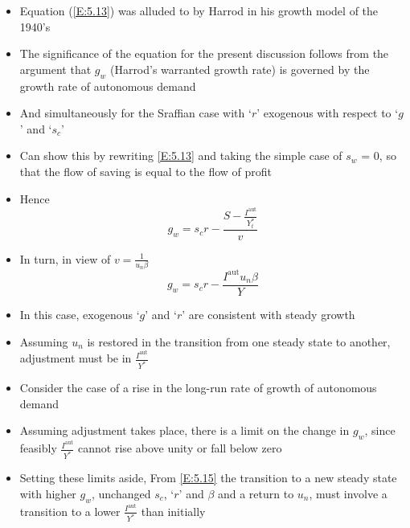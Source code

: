 \documentclass{article}
\begin{document}
\begin{itemize}
		\item Equation (\ref{E:5.13}) was alluded to by Harrod in his growth model of the 1940's
		\item The significance of the equation for the present discussion follows from the argument that \( g_w \) (Harrod's warranted growth rate) is governed by the growth rate of autonomous demand
		\item And simultaneously for the Sraffian case with `\( r \)' exogenous with respect to `\( g \)' and `\( s_c \)'
		\item Can show this by rewriting \cref{E:5.13} and taking the simple case of \( s_w \) = 0, so that the flow of saving is equal to the flow of profit
		\item Hence
		\begin{equation}
			g_w = s_cr - \frac{S-\frac{I^\text{aut}}{Y_t^*}}{v} \label{E:5.14}
		\end{equation}
		\item In turn, in view of \( v = \frac{1}{u_n \beta} \)
		\begin{equation}
			g_w = s_cr-\frac{I^\text{aut}u_n\beta}{Y} \label{E:5.15}
		\end{equation}
		\item In this case, exogenous `\( g \)' and `\( r \)' are consistent with steady growth
		\item Assuming \( u_n \) is restored in the transition from one steady state to another, adjustment must be in \( \frac{I^\text{aut}}{Y^*} \)
		\item Consider the case of a rise in the long-run rate of growth of autonomous demand
		\item Assuming adjustment takes place, there is a limit on the change in \( g_w \), since feasibly \( \frac{I^\text{aut}}{Y^*} \) cannot rise above unity or fall below zero
		\item Setting these limits aside, From \cref{E:5.15} the transition to a new steady state with higher \( g_w \), unchanged \( s_c \), `\( r \)' and \( \beta \) and a return to \( u_n \), must involve a transition to a lower \( \frac{I^\text{aut}}{Y^*} \) than initially
	\end{itemize}
\end{document}
